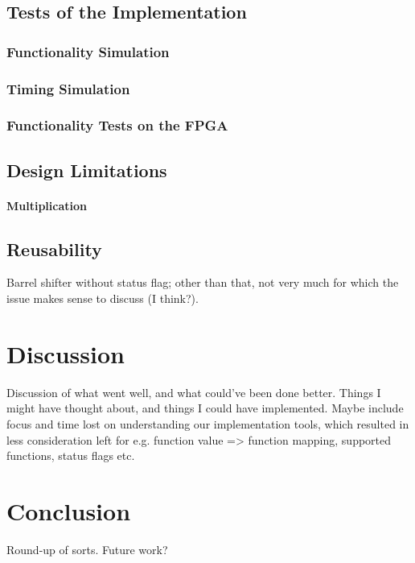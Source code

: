 \documentclass{article}
\begin{document}
\subsection{Tests of the Implementation}
\label{sec:tests}

\subsubsection{Functionality Simulation}
\label{subsec:funcsim}

\subsubsection{Timing Simulation}
\label{subsec:timingsim}

\subsubsection{Functionality Tests on the FPGA}
\label{subsec:funcfpga}

\subsection{Design Limitations}
\label{subsec:limitations}
\paragraph{Multiplication}

\subsection{Reusability}
\label{subsec:reusability}
Barrel shifter without status flag; other than that, not very much for which the issue makes sense to discuss (I think?).

\section{Discussion}
\label{sec:discussion}
Discussion of what went well, and what could've been done better. Things I might have thought about, and things I could have implemented. Maybe include focus and time lost on understanding our implementation tools, which resulted in less consideration left for e.g. function value => function mapping, supported functions, status flags etc.

\section{Conclusion}
\label{sec:conclusion}
Round-up of sorts. Future work?
\end{document}
